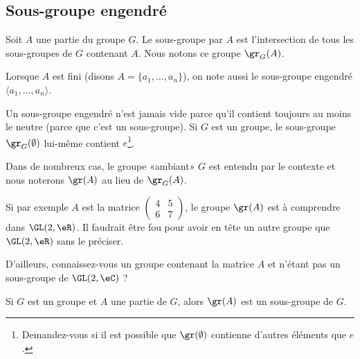 \subsection{Sous-groupe engendré}


\begin{definition}          \label{DefooRDRXooEhVxxu}
	Soit \( A\) une partie du groupe \( G\). Le sous-groupe  par \( A\) est l'intersection de tous les sous-groupes de \( G\) contenant \( A\). Nous notons ce groupe \( \gr_G(A)\).

	Lorsque \( A \) est fini (disons \( A = \{a_1, \dots, a_n\} \)), on note aussi le sous-groupe engendré \( \langle a_1, \dots, a_n \rangle \).
\end{definition}

\begin{normaltext}
	Un sous-groupe engendré n'est jamais vide parce qu'il contient toujours au moins le neutre (parce que c'est un sous-groupe). Si \( G\) est un groupe, le sous-groupe \( \gr_G(\emptyset)\) lui-même contient \( e\)\footnote{Demandez-vous si il est possible que \( \gr(\emptyset)\) contienne d'autres éléments que \( e\).}.
\end{normaltext}

\begin{normaltext}
	Dans de nombreux cas, le groupe «ambiant» \( G\) est entendu par le contexte et nous noterons \( \gr(A)\) au lieu de \( \gr_G(A)\).

	Si par exemple \( A\) est la matrice \( \begin{pmatrix}
		4 & 5 \\
		6 & 7
	\end{pmatrix}\), le groupe \( \gr(A)\) est à comprendre dans \( \GL(2,\eR)\). Il faudrait être fou pour avoir en tête un autre groupe que \( \GL(2,\eR)\) sans le préciser.

	D'ailleurs, connaissez-vous un groupe contenant la matrice \( A\) et n'étant pas un sous-groupe de \( \GL(2,\eC)\) ?
\end{normaltext}

\begin{lemma}
	Si \( G\) est un groupe et \( A\) une partie de \( G\), alors \( \gr(A)\) est un sous-groupe de \( G\).
\end{lemma}

